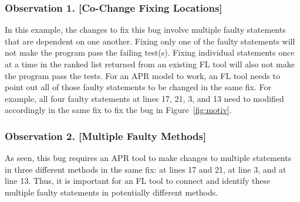 \subsubsection{{\bf Observation 1. [Co-Change Fixing Locations]}}
In this example, the changes to fix this bug involve multiple faulty
statements that are dependent on one another. Fixing only one of the
faulty statements will not make the program pass the failing
test(s). Fixing individual statements once at a time in the ranked
list returned from an existing FL tool will also not make the program
pass the tests. For an APR model to work, an FL tool needs to point
out all of those faulty statements to be changed in the same fix.  For
example, all four faulty statements at lines 17, 21, 3, and 13 need to
modified accordingly in the same fix to fix the bug in
Figure~\ref{fig:motiv}.



\subsubsection{{\bf Observation 2. [Multiple Faulty Methods]}}

As seen, this bug requires an APR tool to make changes to multiple
statements in three different methods in the same fix:
  at lines 17 and 21,  at line
3, and  at line 13. Thus, it is important for an
FL tool to connect and identify these multiple faulty statements in
potentially different methods.


